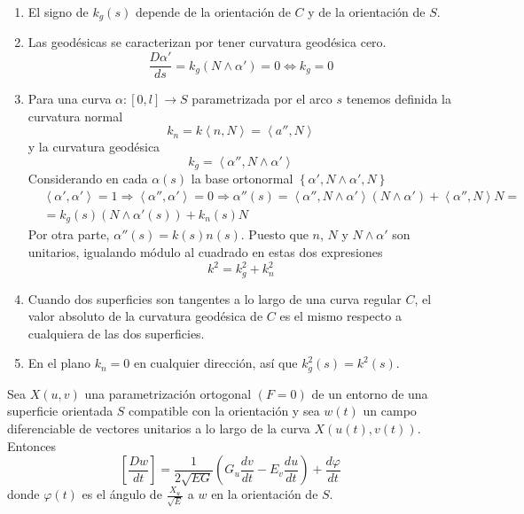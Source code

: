 \begin{remark}
    \hfill
    \begin{enumerate}
        \item El signo de $k_g(s)$ depende de la orientación de $C$ y de la orientación de $S$.
        \item Las geodésicas se caracterizan por tener curvatura geodésica cero.
              $$\frac{D\alpha'}{ds} = k_g(N \land \alpha') = 0 \Leftrightarrow k_g = 0$$
        \item Para una curva $\alpha : [0, l] \to S$ parametrizada por el arco $s$ tenemos definida la curvatura normal
              $$k_n = k \left\langle n, N \right\rangle = \left\langle a'', N \right\rangle$$
              y la curvatura geodésica
              $$k_g = \left\langle \alpha'', N \land \alpha' \right\rangle$$
              Considerando en cada $\alpha(s)$ la base ortonormal $\left\{ \alpha', N \land \alpha', N \right\}$
              \begin{align*}
                   & \left\langle \alpha', \alpha' \right\rangle = 1 \Rightarrow \left\langle \alpha'', \alpha' \right\rangle = 0 \Rightarrow \alpha''(s) = \left\langle \alpha'', N \land \alpha' \right\rangle (N \land \alpha') + \left\langle \alpha'', N \right\rangle N = \\
                   & = k_g(s) (N \land \alpha'(s)) + k_n(s)N
              \end{align*}
              Por otra parte, $\alpha''(s) = k(s)n(s)$.
              Puesto que $n$, $N$ y $N \land \alpha'$ son unitarios, igualando módulo al cuadrado en estas dos expresiones
              $$k^2 = k_g^2 + k_n^2$$
        \item Cuando dos superficies son tangentes a lo largo de una curva regular $C$, el valor absoluto de la curvatura geodésica de $C$ es el mismo respecto a cualquiera de las dos superficies.
        \item En el plano $k_n = 0$ en cualquier dirección, así que $k_g^2(s) = k^2(s)$.
    \end{enumerate}
\end{remark}

\begin{proposition}
    Sea $X(u, v)$ una parametrización ortogonal $(F=0)$ de un entorno de una superficie orientada $S$ compatible con la orientación y sea $w(t)$ un campo diferenciable de vectores unitarios a lo largo de la curva $X(u(t), v(t))$. Entonces
    $$\left[ \frac{Dw}{dt} \right] = \frac{1}{2\sqrt{EG}} \left( G_u \frac{dv}{dt} - E_v \frac{du}{dt} \right) + \frac{d\varphi}{dt}$$
    donde $\varphi(t)$ es el ángulo de $\frac{X_u}{\sqrt{E}}$ a $w$ en la orientación de $S$.
\end{proposition}

